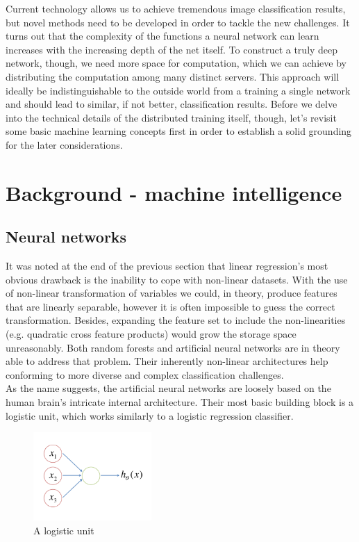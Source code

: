 \documentclass[a4paper, 12pt]{article}
\numberwithin{equation}{section}
\begin{document}
	Current technology allows us to achieve tremendous image classification results, but novel methods need to be developed in order to tackle the new challenges. It turns out that the complexity of the functions a neural network can learn increases with the increasing depth of the net itself. To construct a truly deep network, though, we need more space for computation, which we can achieve by distributing the computation among many distinct servers. This approach will ideally be indistinguishable to the outside world from a training a single network and should lead to similar, if not better, classification results. Before we delve into the technical details of the distributed training itself, though, let's revisit some basic machine learning concepts first in order to establish a solid grounding for the later considerations.
	
	\section{Background - machine intelligence}
	
	\subsection{Neural networks}
	
	\cite{ng2015coursera} It was noted at the end of the previous section that linear regression's most obvious drawback is the inability to cope with non-linear datasets. With the use of non-linear transformation of variables we could, in theory, produce features that are linearly separable, however it is often impossible to guess the correct transformation. Besides, expanding the feature set to include the non-linearities (e.g. quadratic cross feature products) would grow the storage space unreasonably. Both random forests and artificial neural networks are in theory able to address that problem. Their inherently non-linear architectures help conforming to more diverse and complex classification challenges. \\
	
	As the name suggests, the artificial neural networks are loosely based on the human brain's intricate internal architecture. Their most basic building block is a logistic unit, which works similarly to a logistic regression classifier.
	
	\begin{figure}[!h]
		\centering
		\includegraphics[page=1,width=0.40\textwidth]{logistic_unit.pdf}
		\caption{\label{fig:logistic_unit}{A logistic unit}}
	\end{figure}
	
\end{document}
